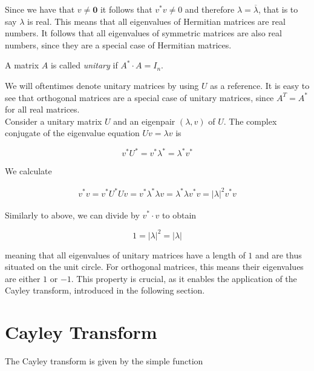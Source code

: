 Since we have that $v \neq \mathbf{0}$ it follows that $v^* v \neq 0$
and therefore $\lambda = \overline{\lambda}$, that is to say $\lambda$ is real.
This means that all eigenvalues of Hermitian matrices are real numbers.
It follows that all eigenvalues of symmetric matrices are also real numbers, since they are a special case of Hermitian matrices.

\begin{definition}
    A matrix $A$ is called \emph{unitary} if $A^* \cdot A = I_n$.
\end{definition}

We will oftentimes denote unitary matrices by using $U$ as a reference.
It is easy to see that orthogonal matrices are a special case of unitary matrices, since $A^T = A^*$ for all real matrices.\\
Consider a unitary matrix $U$ and an eigenpair $(\lambda, v)$ of $U$.
The complex conjugate of the eigenvalue equation $U v = \lambda v$ is

\begin{equation} \label{eq:eigenvalue_equation_complex_conjugate}
    v^* U^* = v^* \lambda^* = \lambda^* v^*
\end{equation}

We calculate

\begin{align*}
    v^* v = v^* U^* U v = v^* \lambda^* \lambda v = \lambda^* \lambda v^* v = \left| \lambda \right|^2 v^* v
\end{align*}

Similarly to above, we can divide by $v^* \cdot v$ to obtain

\begin{equation} \label{eq:unitary_eigenvalues}
    1 = \left| \lambda \right|^2 = \left| \lambda \right|
\end{equation}

meaning that all eigenvalues of unitary matrices have a length of $1$ and are thus situated on the unit circle.
For orthogonal matrices, this means their eigenvalues are either $1$ or $-1$.
This property is crucial, as it enables the application of the Cayley transform,
introduced in the following section.

\section{Cayley Transform}

The Cayley transform is given by the simple function

